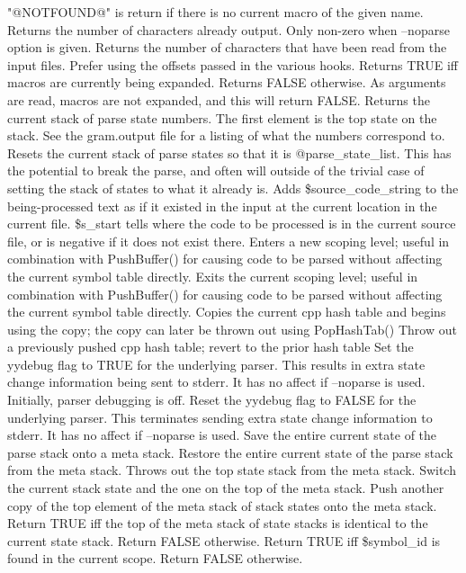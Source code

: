 "@NOTFOUND@" is return if there is no current macro of the given name.
Returns the number of characters already output.  Only non-zero when 
--noparse option is given.
Returns the number of characters that have been read from the
input files.  Prefer using the offsets passed in the various hooks.
Returns TRUE iff macros are currently being expanded.
Returns FALSE otherwise.  As arguments are read, macros are not expanded,
and this will return FALSE.
Returns the current stack of parse state numbers.  The first element is
the top state on the stack.  See the gram.output
file for a listing of what the numbers correspond to.
Resets the current stack of parse states so that it is @parse\_\-state\_\-list.
This has the potential to break the parse, and often will outside
of the trivial case of setting the stack of states to what it already is.
Adds \$source\_\-code\_\-string to the being-processed text 
as if it existed in the input at the
current location in the current file. \$s\_\-start tells
where the code to be processed is in the current source
file, or is negative if it does not exist there.
Enters a new scoping level; useful in combination
with PushBuffer() for causing code to be parsed without
affecting the current symbol table directly.
Exits the current scoping level; useful in combination
with PushBuffer() for causing code to be parsed without
affecting the current symbol table directly.
Copies the current cpp hash table and begins using the copy;  the copy
can later be thrown out using PopHashTab()
Throw out a previously pushed cpp hash table; revert to the prior
hash table
Set the yydebug flag to TRUE for the underlying parser.
This results in extra state change information being sent to stderr.
It has no affect if --noparse is used.  Initially, parser debugging is off.
Reset the yydebug flag to FALSE for the underlying parser.  
This terminates sending extra state change information to stderr.
It has no affect if --noparse is used.
Save the entire current state of the parse stack onto a meta stack.
Restore the entire current state of the parse stack from the meta stack.
Throws out the top state stack from the meta stack.
Switch the current stack state and the one on the top of the meta stack.
Push another copy of the top element of the meta stack of stack states onto
the meta stack.
Return TRUE iff the top of the meta stack of state stacks is
identical to the current state stack. Return FALSE otherwise.
Return TRUE iff \$symbol\_\-id is found in the current scope.
Return FALSE otherwise.
